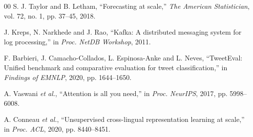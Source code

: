\documentclass[conference]{IEEEtran}
\begin{document}
\begin{thebibliography}{00}
 S. J. Taylor and B. Letham, ``Forecasting at scale,''
\emph{The American Statistician}, vol. 72, no. 1, pp. 37--45, 2018.

 J. Kreps, N. Narkhede and J. Rao, ``Kafka: A distributed
messaging system for log processing,'' in \emph{Proc. NetDB Workshop}, 2011.

 F. Barbieri, J. Camacho-Collados, L. Espinosa-Anke and
L. Neves, ``TweetEval: Unified benchmark and comparative evaluation for tweet
classification,'' in \emph{Findings of EMNLP}, 2020, pp. 1644--1650.

 A. Vaswani \emph{et al.}, ``Attention is all you need,'' in
\emph{Proc. NeurIPS}, 2017, pp. 5998--6008.

 A. Conneau \emph{et al.}, ``Unsupervised cross-lingual
representation learning at scale,'' in \emph{Proc. ACL}, 2020, pp. 8440--8451.

\end{thebibliography}
\end{document}
